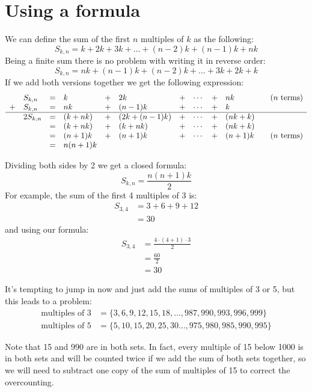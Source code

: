 \documentclass{article}
\begin{document}
\section*{Using a formula}
We can define the sum of the first \(n\) multiples of \(k\) as the following:
\[ S_{k, n} = k + 2k + 3k + \dots + (n-2)k + (n-1)k + nk \]
Being a finite sum there is no problem with writing it in reverse order:
\[ S_{k, n} = nk + (n-1)k + (n-2)k + \dots + 3k + 2k + k \]
If we add both versions together we get the following expression:
\[ \begin{array}{rlllllllllll}
    & S_{k, n} &= &k &+ &2k &+ &\cdots &+ &nk && \text{(\(n\) terms)} \\
    + & S_{k, n} &= &nk &+ &(n-1)k &+ &\cdots &+ &k \\
    \hline & 2S_{k, n} &= &(k+nk) &+ &(2k+(n-1)k) &+ &\cdots &+ &(nk+k) \\
    & &= &(k + nk) &+ &(k + nk) &+ &\cdots &+ &(nk + k) \\
    & &= &(n+1)k &+ &(n+1)k &+ &\cdots &+ &(n+1)k && \text{(\(n\) terms)} \\
    & &= &n(n+1)k \end{array}
\]

Dividing both sides by 2 we get a closed formula:
\[ S_{k, n} = \frac{n(n+1)k}{2} \]
For example, the sum of the first 4 multiples of 3 is:
\[ \begin{aligned}
    S_{3, 4} &= 3 + 6 + 9 + 12 \\
    &= 30
\end{aligned} \]
and using our formula:
\[ \begin{aligned}
    S_{3, 4} &= \frac{4 \cdot (4+1) \cdot 3}{2} \\
    &= \frac{60}{2} \\
    &= 30
\end{aligned} \]

It's tempting to jump in now and just add the sums of multiples of 3 or 5, but
this leads to a problem:
\[ \begin{aligned}
    \text{multiples of 3} &= \{3, 6, 9, 12, 15, 18, \dots, 987, 990, 993, 996,
                               999\} \\
    \text{multiples of 5} &= \{5, 10, 15, 20, 25, 30 \dots, 975, 980, 985, 990,
                               995\}
\end{aligned} \]

Note that 15 and 990 are in both sets. In fact, every multiple of 15 below 1000
is in both sets and will be counted twice if we add the sum of both sets
together, so we will need to subtract one copy of the sum of multiples of 15 to
correct the overcounting.
\end{document}
